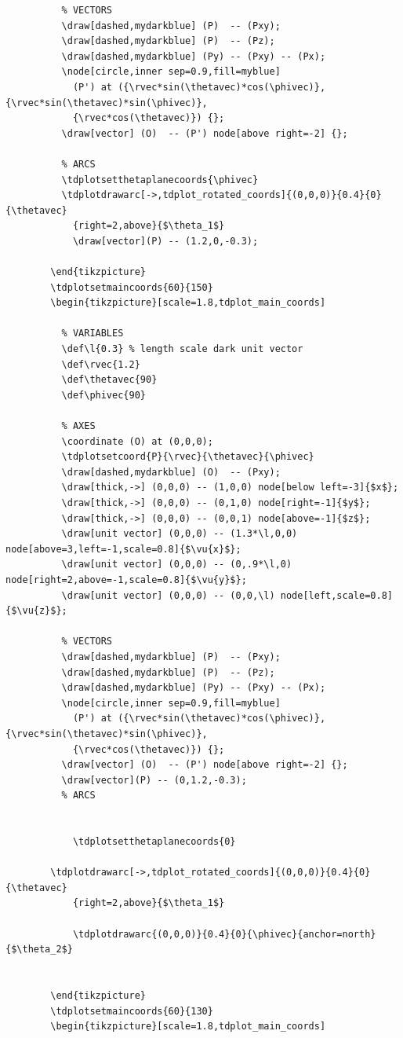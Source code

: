 \documentclass[letter, 10pts]{article}
\begin{document}
\begin{multicols}{2}
\begin{tiny}
\begin{verbatim}
		  % VECTORS
		  \draw[dashed,mydarkblue] (P)  -- (Pxy);
		  \draw[dashed,mydarkblue] (P)  -- (Pz);
		  \draw[dashed,mydarkblue] (Py) -- (Pxy) -- (Px);
		  \node[circle,inner sep=0.9,fill=myblue]
			(P') at ({\rvec*sin(\thetavec)*cos(\phivec)},{\rvec*sin(\thetavec)*sin(\phivec)},
			{\rvec*cos(\thetavec)}) {};
		  \draw[vector] (O)  -- (P') node[above right=-2] {};
		  
		  % ARCS
		  \tdplotsetthetaplanecoords{\phivec}
		  \tdplotdrawarc[->,tdplot_rotated_coords]{(0,0,0)}{0.4}{0}{\thetavec}
			{right=2,above}{$\theta_1$}
			\draw[vector](P) -- (1.2,0,-0.3);
		   
		\end{tikzpicture}
		\tdplotsetmaincoords{60}{150}
		\begin{tikzpicture}[scale=1.8,tdplot_main_coords]
		  
		  % VARIABLES
		  \def\l{0.3} % length scale dark unit vector
		  \def\rvec{1.2}
		  \def\thetavec{90}
		  \def\phivec{90}
		  
		  % AXES
		  \coordinate (O) at (0,0,0);
		  \tdplotsetcoord{P}{\rvec}{\thetavec}{\phivec}
		  \draw[dashed,mydarkblue] (O)  -- (Pxy);
		  \draw[thick,->] (0,0,0) -- (1,0,0) node[below left=-3]{$x$};
		  \draw[thick,->] (0,0,0) -- (0,1,0) node[right=-1]{$y$};
		  \draw[thick,->] (0,0,0) -- (0,0,1) node[above=-1]{$z$};
		  \draw[unit vector] (0,0,0) -- (1.3*\l,0,0) node[above=3,left=-1,scale=0.8]{$\vu{x}$};
		  \draw[unit vector] (0,0,0) -- (0,.9*\l,0) node[right=2,above=-1,scale=0.8]{$\vu{y}$};
		  \draw[unit vector] (0,0,0) -- (0,0,\l) node[left,scale=0.8]{$\vu{z}$};
		  
		  % VECTORS
		  \draw[dashed,mydarkblue] (P)  -- (Pxy);
		  \draw[dashed,mydarkblue] (P)  -- (Pz);
		  \draw[dashed,mydarkblue] (Py) -- (Pxy) -- (Px);
		  \node[circle,inner sep=0.9,fill=myblue]
			(P') at ({\rvec*sin(\thetavec)*cos(\phivec)},{\rvec*sin(\thetavec)*sin(\phivec)},
			{\rvec*cos(\thetavec)}) {};
		  \draw[vector] (O)  -- (P') node[above right=-2] {};
		  \draw[vector](P) -- (0,1.2,-0.3);
		  % ARCS
		
		
			\tdplotsetthetaplanecoords{0}
		
		\tdplotdrawarc[->,tdplot_rotated_coords]{(0,0,0)}{0.4}{0}{\thetavec}
			{right=2,above}{$\theta_1$}	
		
			\tdplotdrawarc{(0,0,0)}{0.4}{0}{\phivec}{anchor=north}{$\theta_2$}
		
		  
		\end{tikzpicture}
		\tdplotsetmaincoords{60}{130}
		\begin{tikzpicture}[scale=1.8,tdplot_main_coords]
		  

\end{verbatim}
\end{tiny}
\end{multicols}
\end{document}
